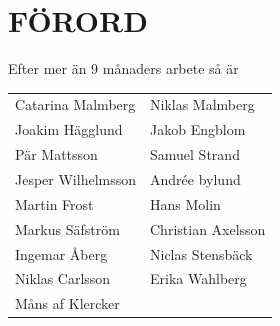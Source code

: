 \documentclass[a6paper,fontsize=10pt,twoside,open=right]{scrbook}
\begin{document}
\section{FÖRORD}\vspace{10pt}
\hspace{10pt} Efter mer än 9 månaders arbete så är\par
\noindent
\begin{tabular}{@{}p{}p{}@{}}
  Catarina Malmberg & Niklas Malmberg\\
  Joakim Hägglund & Jakob Engblom\\
  Pär Mattsson & Samuel Strand\\
  Jesper Wilhelmsson & Andrée bylund\\
  Martin Frost & Hans Molin\\
  Markus Säfström & Christian Axelsson\\
  Ingemar Åberg & Niclas Stensbäck\\
  Niklas Carlsson & Erika Wahlberg\\
  Måns af Klercker &
\end{tabular}\par
\end{document}
